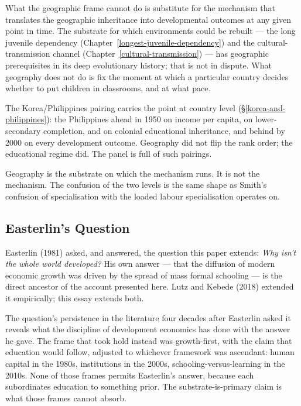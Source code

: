 \documentclass[12pt,letterpaper]{article}
\begin{document}
{What the geographic frame cannot do is substitute for the mechanism that translates the geographic inheritance into developmental outcomes at any given point in time. The substrate for which environments could be rebuilt --- the long juvenile dependency (Chapter~\ref{longest-juvenile-dependency}) and the cultural-transmission channel (Chapter~\ref{cultural-transmission}) --- has geographic prerequisites in its deep evolutionary history; that is not in dispute. What geography does not do is fix the moment at which a particular country decides whether to put children in classrooms, and at what pace.

The Korea/Philippines pairing carries the point at country level (§\ref{korea-and-philippines}): the Philippines ahead in 1950 on income per capita, on lower-secondary completion, and on colonial educational inheritance, and behind by 2000 on every development outcome. Geography did not flip the rank order; the educational regime did. The panel is full of such pairings.

Geography is the substrate on which the mechanism runs. It is not the mechanism. The confusion of the two levels is the same shape as Smith's confusion of specialisation with the loaded labour specialisation operates on.

\subsection{Easterlin's Question}\label{easterlins-question}

Easterlin (1981) asked, and answered, the question this paper extends: \emph{Why isn't the whole world developed?} His own answer --- that the diffusion of modern economic growth was driven by the spread of mass formal schooling --- is the direct ancestor of the account presented here. Lutz and Kebede (2018) extended it empirically; this essay extends both.

The question's persistence in the literature four decades after Easterlin asked it reveals what the discipline of development economics has done with the answer he gave. The frame that took hold instead was growth-first, with the claim that education would follow, adjusted to whichever framework was ascendant: human capital in the 1980s, institutions in the 2000s, schooling-versus-learning in the 2010s. None of those frames permits Easterlin's answer, because each subordinates education to something prior. The substrate-is-primary claim is what those frames cannot absorb.

}
\end{document}
